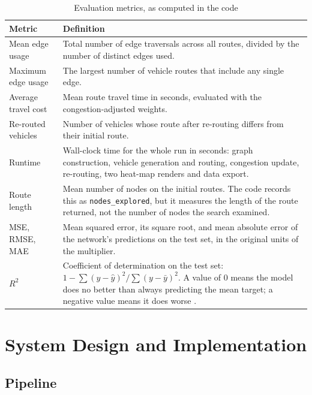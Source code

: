 \documentclass[12pt]{report}
\newcommand{\code}[1]{\texttt{#1}}
\begin{document}
\begin{table}[htbp]
\centering
\caption{Evaluation metrics, as computed in the code}
\label{tab:metrics}
\small
\begin{tabularx}{\textwidth}{>{\raggedright\arraybackslash}p{3.6cm}X}
\toprule
Metric & Definition \\
\midrule
Mean edge usage & Total number of edge traversals across all routes, divided by the number of distinct edges used. \\
Maximum edge usage & The largest number of vehicle routes that include any single edge. \\
Average travel cost & Mean route travel time in seconds, evaluated with the congestion-adjusted weights. \\
Re-routed vehicles & Number of vehicles whose route after re-routing differs from their initial route. \\
Runtime & Wall-clock time for the whole run in seconds: graph construction, vehicle generation and routing, congestion update, re-routing, two heat-map renders and data export. \\
Route length & Mean number of nodes on the initial routes. The code records this as \code{nodes\_explored}, but it measures the length of the route returned, not the number of nodes the search examined. \\
MSE, RMSE, MAE & Mean squared error, its square root, and mean absolute error of the network's predictions on the test set, in the original units of the multiplier. \\
$R^2$ & Coefficient of determination on the test set: $1 - \sum (y-\hat{y})^2 / \sum (y - \bar{y})^2$. A value of 0 means the model does no better than always predicting the mean target; a negative value means it does worse \citep{chicco2021coefficient}. \\
\bottomrule
\end{tabularx}
\end{table}


\chapter{System Design and Implementation}
\label{ch:implementation}

\section{Pipeline}
\end{document}
